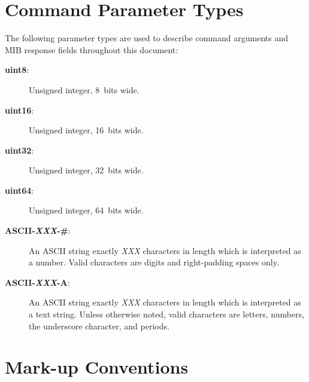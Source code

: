 \section{Command Parameter Types}

The following parameter types are used to describe command arguments and MIB
response fields throughout this document:

\begin{description}
    \item[\textbf{uint8}:] Unsigned integer, 8~bits wide.

    \item[\textbf{uint16}:] Unsigned integer, 16~bits wide.

    \item[\textbf{uint32}:] Unsigned integer, 32~bits wide.

    \item[\textbf{uint64}:] Unsigned integer, 64~bits wide.

    \item[\textbf{ASCII-\textit{XXX}-\#}:] An ASCII string exactly \textit{XXX}
        characters in length which is interpreted as a number.  Valid characters
        are digits and right-padding spaces only.

    \item[\textbf{ASCII-\textit{XXX}-A}:] An ASCII string exactly \textit{XXX}
        characters in length which is interpreted as a text string.  Unless
        otherwise noted, valid characters are letters, numbers, the underscore
        character, and periods.
\end{description}

\section{Mark-up Conventions}

